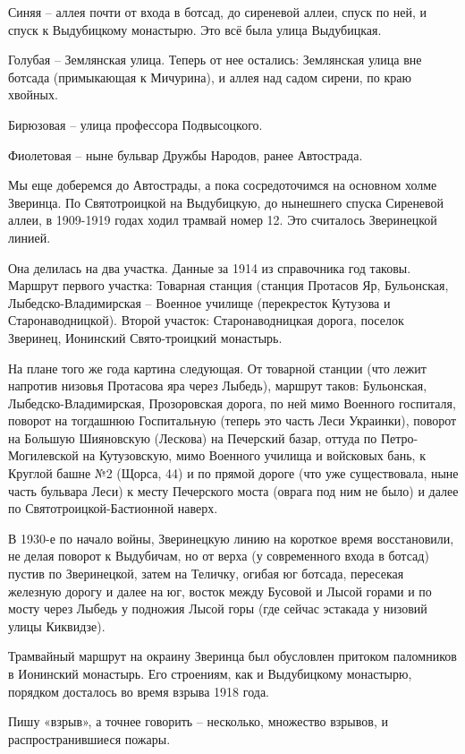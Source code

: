 Синяя – аллея почти от входа в ботсад, до сиреневой аллеи, спуск по ней, и спуск к Выдубицкому монастырю. Это всё была улица Выдубицкая.

Голубая – Землянская улица. Теперь от нее остались: Землянская улица вне ботсада (примыкающая к Мичурина), и аллея над садом сирени, по краю хвойных.

Бирюзовая – улица профессора Подвысоцкого.

Фиолетовая – ныне бульвар Дружбы Народов, ранее Автострада.

Мы еще доберемся до Автострады, а пока сосредоточимся на основном холме Зверинца. По Святотроицкой на Выдубицкую, до нынешнего спуска Сиреневой аллеи, в 1909-1919 годах ходил трамвай номер 12. Это считалось Зверинецкой линией.

Она делилась на два участка. Данные за 1914 из справочника год таковы. Маршрут первого участка: Товарная станция (станция Протасов Яр, Бульонская, Лыбедско-Владимирская – Военное училище (перекресток Кутузова и Старонаводницкой). Второй участок: Старонаводницкая дорога, поселок Зверинец, Ионинский Свято-троицкий монастырь.

На плане того же года картина следующая. От товарной станции (что лежит напротив низовья Протасова яра через Лыбедь), маршрут таков: Бульонская, Лыбедско-Владимирская, Прозоровская дорога, по ней мимо Военного госпиталя, поворот на тогдашнюю Госпитальную (теперь это часть Леси Украинки), поворот на Большую Шияновскую (Лескова) на Печерский базар, оттуда по Петро-Могилевской на Кутузовскую, мимо Военного училища и войсковых бань, к Круглой башне №2 (Щорса, 44) и по прямой дороге (что уже существовала, ныне часть бульвара Леси) к месту Печерского моста (оврага под ним не было) и далее по Святотроицкой-Бастионной наверх.

В 1930-е по начало войны, Зверинецкую линию на короткое время восстановили, не делая поворот к Выдубичам, но от верха (у современного входа в ботсад) пустив по Зверинецкой, затем на Теличку, огибая юг ботсада, пересекая железную дорогу и далее на юг, восток между Бусовой и Лысой горами и по мосту через Лыбедь у подножия Лысой горы (где сейчас эстакада у низовий улицы Киквидзе).

Трамвайный маршрут на окраину Зверинца был обусловлен притоком паломников в Ионинский монастырь. Его строениям, как и Выдубицкому монастырю, порядком досталось во время взрыва 1918 года.

Пишу «взрыв», а точнее говорить – несколько, множество взрывов, и распространившиеся пожары.

